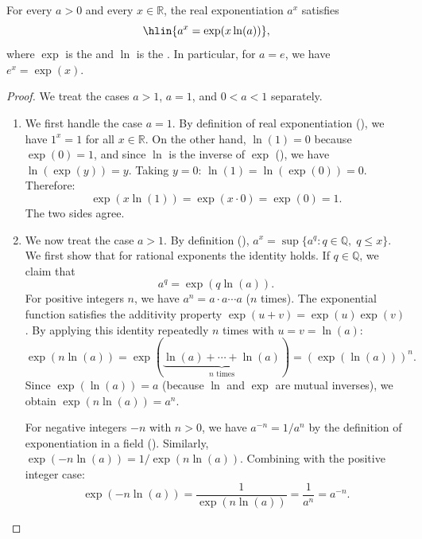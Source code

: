 \begin{proposition} \label{proposition:real_exponentiation_via_exp_and_ln}
    For every $a > 0$ and every $x \in \mathbb{R}$, the real exponentiation $a^x$ satisfies
    $$\hlin{a^x = \exp(x \ln(a))},$$
    where $\exp$ is the  and $\ln$ is the . In particular, for $a = e$, we have $e^x = \exp(x)$.
\end{proposition}
\begin{proof}
    We treat the cases $a > 1$, $a = 1$, and $0 < a < 1$ separately.

\begin{enumerate}
    \item We first handle the case $a = 1$. By definition of real exponentiation (), we have $1^x = 1$ for all $x \in \mathbb{R}$. On the other hand, $\ln(1) = 0$ because $\exp(0) = 1$, and since $\ln$ is the inverse of $\exp$ (), we have $\ln(\exp(y)) = y$. Taking $y = 0$: $\ln(1) = \ln(\exp(0)) = 0$. Therefore:
    $$\exp(x \ln(1)) = \exp(x \cdot 0) = \exp(0) = 1.$$
    The two sides agree.

    \item We now treat the case $a > 1$. By definition (), $a^x = \sup\{ a^q : q \in \mathbb{Q},\; q \leq x \}$. We first show that for rational exponents the identity holds. If $q \in \mathbb{Q}$, we claim that
    $$a^q = \exp(q \ln(a)).$$
    For positive integers $n$, we have $a^n = a \cdot a \cdots a$ ($n$ times). The exponential function satisfies the additivity property $\exp(u+v) = \exp(u)\exp(v)$. By applying this identity repeatedly $n$ times with $u = v = \ln(a)$:
    $$\exp(n \ln(a)) = \exp(\underbrace{\ln(a) + \cdots + \ln(a)}_{n \text{ times}}) = (\exp(\ln(a)))^n.$$
    Since $\exp(\ln(a)) = a$ (because $\ln$ and $\exp$ are mutual inverses), we obtain $\exp(n \ln(a)) = a^n$.

    For negative integers $-n$ with $n > 0$, we have $a^{-n} = 1/a^n$ by the definition of exponentiation in a field (). Similarly, $\exp(-n \ln(a)) = 1/\exp(n \ln(a))$. Combining with the positive integer case:
    $$\exp(-n \ln(a)) = \frac{1}{\exp(n \ln(a))} = \frac{1}{a^n} = a^{-n}.$$


\end{enumerate}
\end{proof}
